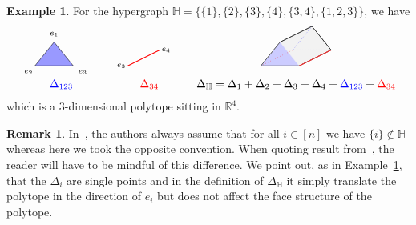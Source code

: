 \documentclass[reqno]{amsart}
\theoremstyle{definition}
\newtheorem{example}[theorem]{Example}
\newtheorem{remark}[theorem]{Remark}
\newcommand{\R}{\mathbb{R}} %
\newcommand{\blue}[1]{{\color{blue} #1}} %
\newcommand{\red}[1]{{\color{red} #1}} %
\newcommand{\HH}{\mathbb H}  %
\begin{document}
\begin{example}\label{ex:DH}
For the hypergraph
$\HH=\big\{\{1\},\{2\},\{3\},\{4\},\{3,4\},\{1,2,3\}\big\}$,
we  have
$$\begin{array}{ccc}
 \begin{tikzpicture}[scale=1,baseline=.5cm]
	\node (1) at (0.6,1.0) {$\scriptstyle e_1$};
	\node (2) at (-.2,-.2) {$\scriptstyle e_2$};
	\node (3) at (1.5,-.2) {$\scriptstyle e_3$};
	\draw [fill=blue!40] (0,0) -- (.6,.75) -- (1.2,0) --(0,0) ; 
\end{tikzpicture} \quad &
 \begin{tikzpicture}[scale=1,baseline=.5cm]
	\node at (-.2,0) {$\scriptstyle e_3$};
	\node at (1.2,.5) {$\scriptstyle e_4$};
	\draw [thick,color=red] (0,0) -- (1,.5 ); 
\end{tikzpicture} \quad &
\begin{tikzpicture}[scale=1,baseline=.5cm]
	\draw [fill=gray!10] (0,0) -- (.6,.75)-- (1.6,1.25) -- (2.2,.5) -- (1.2,0) --(0,0) ; 
	\draw [color=gray!10,fill=blue!20] (0,0) -- (.6,.75) -- (1.2,0) --(0,0) ; 
	\draw [dotted,color=red] (0,0)--(1,.5);
	\draw [dotted,color=blue] (1.6,1.25)--(1,.5)--(2.2,.5);
	\draw (0,0) -- (.6,.75)-- (1.6,1.25) -- (2.2,.5) -- (1.2,0) -- (0,0) ; 
	\draw [thick,color=red!80] (1.2,0) -- (2.2,0.5); 
\end{tikzpicture}\\
\blue{{ \Delta}_{123}}& \red{{ \Delta}_{34}} & \Delta_{\HH}=\Delta_1+\Delta_2+\Delta_3+\Delta_4+\blue{{ \Delta}_{123}}+ \red{{ \Delta}_{34}}\\
\end{array}
$$
which is a 3-dimensional polytope sitting in $\R^4$. 
\end{example}

\begin{remark}\label{rem:single} In~\cite{BenBerMac}, the authors always assume that for all $i\in[n]$ we have $\{i\}\not\in\HH$ whereas here we took the opposite convention. 
When quoting result from~\cite{BenBerMac}, the reader will have to be mindful of this difference.
We point out, as in  Example~\ref{ex:DH}, that the $\Delta_i$ are single points and in the definition of $\Delta_{\HH}$ it simply translate the polytope in the direction of $e_i$ but does not affect the  face structure of the polytope.
\end{remark}
\end{document}
